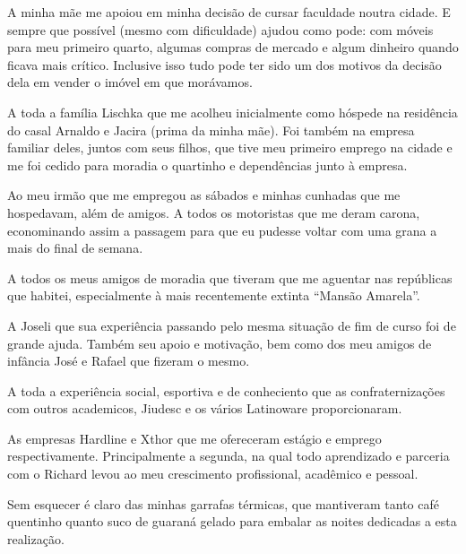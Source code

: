 
A minha mãe me apoiou em minha decisão de cursar faculdade noutra cidade. E
sempre que possível (mesmo com dificuldade) ajudou como pode: com móveis para meu
primeiro quarto, algumas compras de mercado e algum dinheiro quando ficava mais
crítico. Inclusive isso tudo pode ter sido um dos motivos da decisão dela em
vender o imóvel em que morávamos.

A toda a família Lischka que me acolheu inicialmente como hóspede na residência
do casal Arnaldo e Jacira (prima da minha mãe). Foi também na empresa familiar
deles, juntos com seus filhos, que tive meu primeiro emprego na cidade e me foi cedido
para moradia o quartinho e dependências junto à empresa.

Ao meu irmão que me empregou as sábados e minhas cunhadas que me hospedavam, além de amigos. A todos os motoristas que me deram carona, econominando assim a passagem para que eu pudesse voltar com uma grana a mais do final de semana.

A todos os meus amigos de moradia que tiveram que me aguentar nas repúblicas que habitei, especialmente à mais recentemente extinta ``Mansão Amarela''.

A Joseli que sua experiência passando pelo mesma situação de fim de curso foi de grande ajuda. Também seu apoio e motivação, bem como dos meu amigos de infância José e Rafael que fizeram o mesmo.

A toda a experiência social, esportiva e de conheciento que as confraternizações com outros academicos, Jiudesc e os vários Latinoware proporcionaram.

As empresas Hardline e Xthor que me ofereceram estágio e emprego respectivamente. Principalmente a segunda, na qual todo aprendizado e parceria com o Richard levou ao meu crescimento profissional, acadêmico e pessoal.

Sem esquecer é claro das minhas garrafas térmicas, que mantiveram tanto café quentinho quanto suco de guaraná gelado para embalar as noites dedicadas a esta realização.
